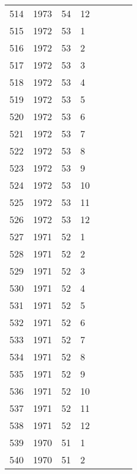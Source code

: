 \begin{longtable}{ |l|l|l|l|l|l|l|l| }
514 & 1973 & 54 &    12 &         &                &  & \\
515 & 1972 & 53 &     1 &         &                &  & \\
516 & 1972 & 53 &     2 &         &                &  & \\
517 & 1972 & 53 &     3 &         &                &  & \\
518 & 1972 & 53 &     4 &         &                &  & \\
519 & 1972 & 53 &     5 &         &                &  & \\
520 & 1972 & 53 &     6 &         &                &  & \\
521 & 1972 & 53 &     7 &         &                &  & \\
522 & 1972 & 53 &     8 &         &                &  & \\
523 & 1972 & 53 &     9 &         &                &  & \\
524 & 1972 & 53 &    10 &         &                &  & \\
525 & 1972 & 53 &    11 &         &                &  & \\
526 & 1972 & 53 &    12 &         &                &  & \\
527 & 1971 & 52 &     1 &         &                &  & \\
528 & 1971 & 52 &     2 &         &                &  & \\
529 & 1971 & 52 &     3 &         &                &  & \\
530 & 1971 & 52 &     4 &         &                &  & \\
531 & 1971 & 52 &     5 &         &                &  & \\
532 & 1971 & 52 &     6 &         &                &  & \\
533 & 1971 & 52 &     7 &         &                &  & \\
534 & 1971 & 52 &     8 &         &                &  & \\
535 & 1971 & 52 &     9 &         &                &  & \\
536 & 1971 & 52 &    10 &         &                &  & \\
537 & 1971 & 52 &    11 &         &                &  & \\
538 & 1971 & 52 &    12 &         &                &  & \\
539 & 1970 & 51 &     1 &         &                &  & \\
540 & 1970 & 51 &     2 &         &                &  & \\

\end{longtable}
